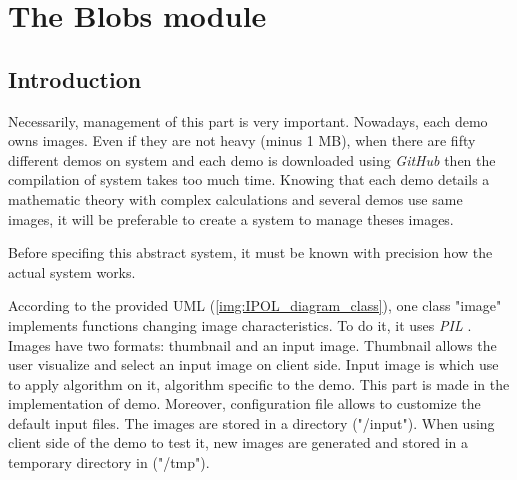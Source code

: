 \section{The Blobs module}


\subsection{Introduction}
\label{sec:blobs_introduction}
Necessarily, management of this part is very important. Nowadays, each demo owns images.
Even if they are not heavy (minus 1 MB),
when there are fifty different demos on system and each demo is downloaded using
\emph{GitHub} \cite{GitHub} then the compilation of system takes too much time.
Knowing that each
demo details a mathematic theory with complex calculations and several demos use
same images, it will be preferable to create a system to manage theses images. \\
\setlength{\parindent}{0cm}

Before specifing this abstract system, it must be known with precision how the actual system
works.\\
\setlength{\parindent}{0cm}

According to the provided UML (\ref{img:IPOL_diagram_class}), one class "image" implements
functions changing image characteristics. To do it, it uses \emph{PIL} \cite{PIL}.
Images have two formats: thumbnail and an input image. Thumbnail allows the user visualize
and select an input image on client side. Input image is which use to apply algorithm on it,
algorithm specific to the demo. This part is made in the implementation of demo.
Moreover, configuration file allows to customize the default input files.
The images are stored in a directory ("/input"). When using client side of the demo to test
it, new images are generated and stored in a temporary directory in ("/tmp").\\
\setlength{\parindent}{0cm}

